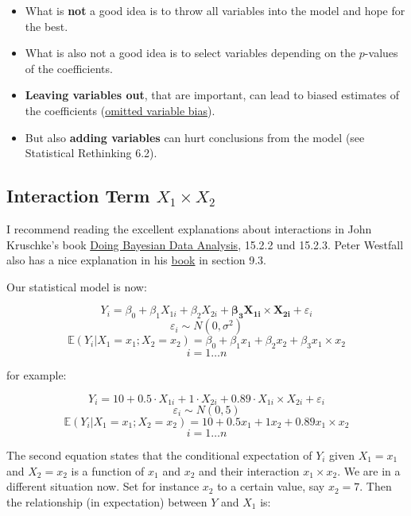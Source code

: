 \documentclass[
]{book}
\providecommand{\tightlist}{%
  \setlength{\itemsep}{0pt}\setlength{\parskip}{0pt}}
\begin{document}
\begin{itemize}
\tightlist
\item
  What is \textbf{not} a good idea is to throw all variables into the model and hope for the best.
\item
  What is also not a good idea is to select variables depending on the \(p\)-values of the coefficients.
\item
  \textbf{Leaving variables out}, that are important, can lead to biased estimates of the coefficients
  (\href{https://en.wikipedia.org/wiki/Omitted-variable_bias}{omitted variable bias}).
\item
  But also \textbf{adding variables} can hurt conclusions from the model (see Statistical Rethinking 6.2).
\end{itemize}

\subsection{\texorpdfstring{Interaction Term \(X_1 \times X_2\)}{Interaction Term X\_1 \textbackslash times X\_2}}\label{interaction_term}

I recommend reading the excellent explanations about interactions
in John Kruschke's book \href{https://nyu-cdsc.github.io/learningr/assets/kruschke_bayesian_in_R.pdf}{Doing Bayesian Data Analysis},
15.2.2 und 15.2.3. Peter Westfall also has a nice explanation in his \href{https://www.routledge.com/Understanding-Regression-Analysis-A-Conditional-Distribution-Approach/Westfall-Arias/p/book/9780367493516?srsltid=AfmBOore3O_Ciecl0TTkr9AjPIY1d6OmbQa7o7IAdKpTSkD8s9HkwzD4}{book}
in section 9.3.

Our statistical model is now:

\[ Y_i = \beta_0 + \beta_1 X_{1i} + \beta_2 X_{2i} + \mathbf{\beta_3 X_{1i} \times X_{2i}} + \varepsilon_i\]
\[ \varepsilon_i \sim N(0, \sigma^2)\]
\[ \mathbb{E}(Y_i|X_1 = x_1; X_2 = x_2) = \beta_0 + \beta_1 x_{1} + \beta_2 x_{2} + \beta_3 x_{1} \times x_{2}\]
\[ i = 1 \ldots n\]

for example:

\[ Y_i = 10 + 0.5 \cdot X_{1i} + 1 \cdot X_{2i} + 0.89 \cdot X_{1i} \times X_{2i} + \varepsilon_i\]
\[ \varepsilon_i \sim N(0, 5)\]
\[ \mathbb{E}(Y_i|X_1 = x_1; X_2 = x_2) = 10 + 0.5 x_1 + 1 x_2 + 0.89 x_1 \times x_2\]
\[ i = 1 \ldots n\]

The second equation states that the conditional expectation of \(Y_i\) given \(X_1=x_1\) and \(X_2=x_2\)
is a function of \(x_1\) and \(x_2\) and their interaction \(x_1 \times x_2\). We are in a different situation now.
Set for instance \(x_2\) to a certain value, say \(x_2 = 7\). Then the relationship (in expectation)
between \(Y\) and \(X_1\) is:
\end{document}
